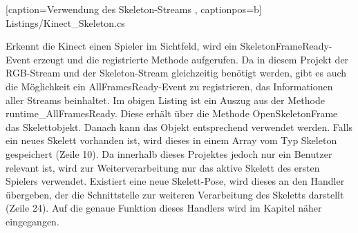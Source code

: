 
    [caption={Verwendung des Skeleton-Streams}
       \label{lst:kinect_skeleton_stream},
       captionpos=b]
{Listings/Kinect_Skeleton.cs}

\noindent
Erkennt die Kinect einen Spieler im Sichtfeld, wird ein SkeletonFrameReady-Event erzeugt und die registrierte Methode aufgerufen. Da in diesem Projekt der RGB-Stream und der Skeleton-Stream gleichzeitig benötigt werden, gibt es auch die Möglichkeit ein \textsf{AllFramesReady}-Event zu registrieren, das Informationen aller Streams beinhaltet. Im obigen Listing ist ein Auszug aus der Methode \textsf{runtime\_AllFramesReady}. Diese erhält über die Methode \textsf{OpenSkeletonFrame} das Skelettobjekt. Danach kann das Objekt entsprechend verwendet werden. Falls ein neues Skelett vorhanden ist, wird dieses in einem Array vom Typ \textsf{Skeleton} gespeichert (Zeile 10). Da innerhalb dieses Projektes jedoch nur ein Benutzer relevant ist, wird zur Weiterverarbeitung nur das aktive Skelett des ersten Spielers verwendet. Existiert eine neue Skelett-Pose, wird dieses an den Handler übergeben, der die Schnittstelle zur weiteren Verarbeitung des Skeletts darstellt (Zeile 24). Auf die genaue Funktion dieses Handlers wird im Kapitel  näher eingegangen.

%
%


